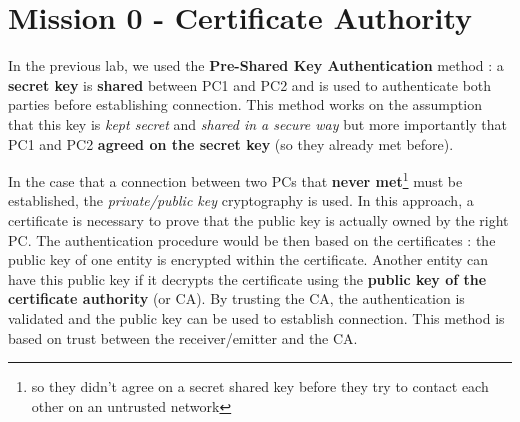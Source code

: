 \documentclass[10pt,a4paper]{ULBreport}
\begin{document}
 



\chapter{Mission 0 - Certificate Authority}






In the previous lab, we used the \textbf{Pre-Shared Key Authentication} method : a \textbf{secret key} is \textbf{shared} between PC1 and PC2 and is used to authenticate both parties before establishing connection. This method works on the assumption that this key is \textit{kept secret} and \textit{shared in a secure way} but more importantly that PC1 and PC2 \textbf{agreed on the secret key} (so they already met before).

In the case that a connection between two PCs that \textbf{never met}\footnote{so they didn't agree on a secret shared key before they try to contact each other on an untrusted network} must be established, the \textit{private/public key} cryptography is used. In this approach, a certificate is necessary to prove that the public key is actually owned by the right PC. The authentication procedure would be then based on the certificates : the public key of one entity is encrypted within the certificate. Another entity can have this public key if it decrypts the certificate using the \textbf{public key of the certificate authority} (or CA). By trusting the CA, the authentication is validated and the public key can be used to establish connection. This method is based on trust between the receiver/emitter and the CA.


\end{document}
